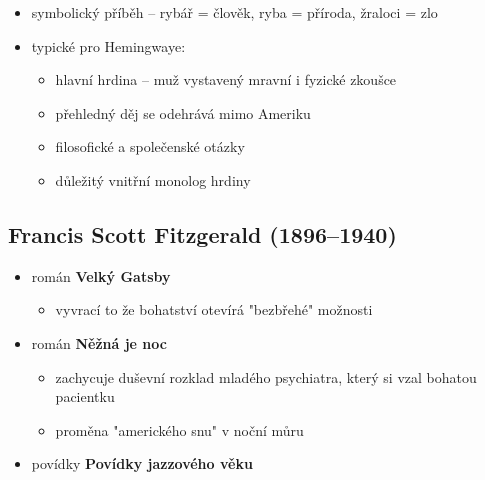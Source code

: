 \begin{itemize}
\begin{itemize}
	\item symbolický příběh -- rybář = člověk, ryba = příroda, žraloci = zlo
	\item typické pro Hemingwaye:
		\begin{itemize}
		\item hlavní hrdina -- muž vystavený mravní i fyzické zkoušce
		\item přehledný děj se odehrává mimo Ameriku
		\item filosofické a společenské otázky
		\item důležitý vnitřní monolog hrdiny
		\end{itemize}
	\end{itemize}
\end{itemize}

\subsection{Francis Scott Fitzgerald (1896--1940)}
\begin{itemize}
\item román \textbf{Velký Gatsby}
	\begin{itemize}
	\item vyvrací to že bohatství otevírá "bezbřehé" možnosti
	\end{itemize}
\item román \textbf{Něžná je noc}
	\begin{itemize}
	\item zachycuje duševní rozklad mladého psychiatra, který si vzal bohatou pacientku
	\item proměna "amerického snu" v noční můru
	\end{itemize}
\item povídky \textbf{Povídky jazzového věku}
\end{itemize}

